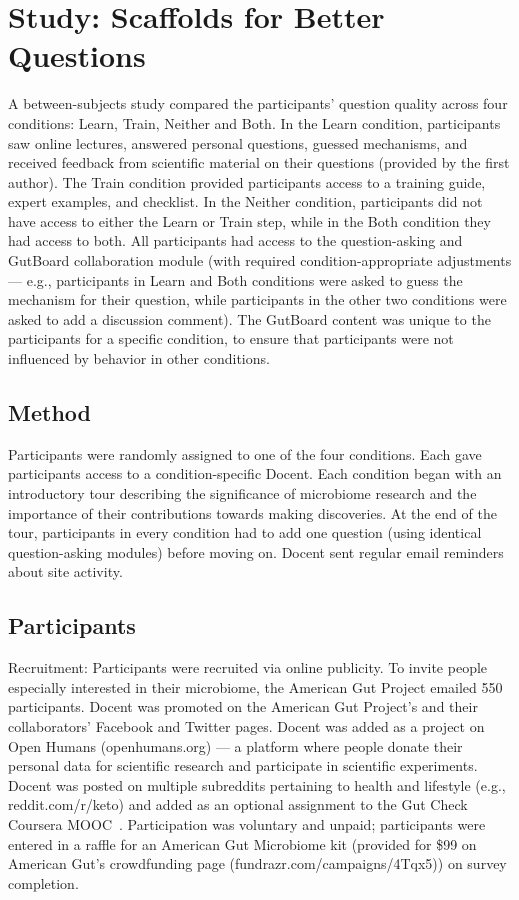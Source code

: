 \section{Study: Scaffolds for Better Questions}
A between-subjects study compared the participants’ question quality across four conditions: Learn, Train, Neither and Both. In the Learn condition, participants saw online lectures, answered personal questions, guessed mechanisms, and received feedback from scientific material on their questions (provided by the first author). The Train condition provided participants access to a training guide, expert examples, and checklist. In the Neither condition, participants did not have access to either the Learn or Train step, while in the Both condition they had access to both. All participants had access to the question-asking and GutBoard collaboration module (with required condition-appropriate adjustments — e.g., participants in Learn and Both conditions were asked to guess the mechanism for their question, while participants in the other two conditions were asked to add a discussion comment). The GutBoard content was unique to the participants for a specific condition, to ensure that participants were not influenced by behavior in other conditions. 

\subsection{Method}
Participants were randomly assigned to one of the four conditions. Each gave participants access to a condition-specific Docent. Each condition began with an introductory tour describing the significance of microbiome research and the importance of their contributions towards making discoveries. At the end of the tour, participants in every condition had to add one question (using identical question-asking modules) before moving on. Docent sent regular email reminders about site activity. 

\subsection{Participants}
Recruitment: Participants were recruited via online publicity. To invite people especially interested in their microbiome, the American Gut Project emailed 550 participants. Docent was promoted on the American Gut Project’s and their collaborators’ Facebook and Twitter pages. Docent was added as a project on Open Humans (openhumans.org) — a platform where people donate their personal data for scientific research and participate in scientific experiments. Docent was posted on multiple subreddits pertaining to health and lifestyle (e.g., reddit.com/r/keto) and added as an optional assignment to the Gut Check Coursera MOOC~\cite{Knight2016}. Participation was voluntary and unpaid; participants were entered in a raffle for an American Gut Microbiome kit (provided for \$99 on American Gut’s crowdfunding page (fundrazr.com/campaigns/4Tqx5)) on survey completion.

